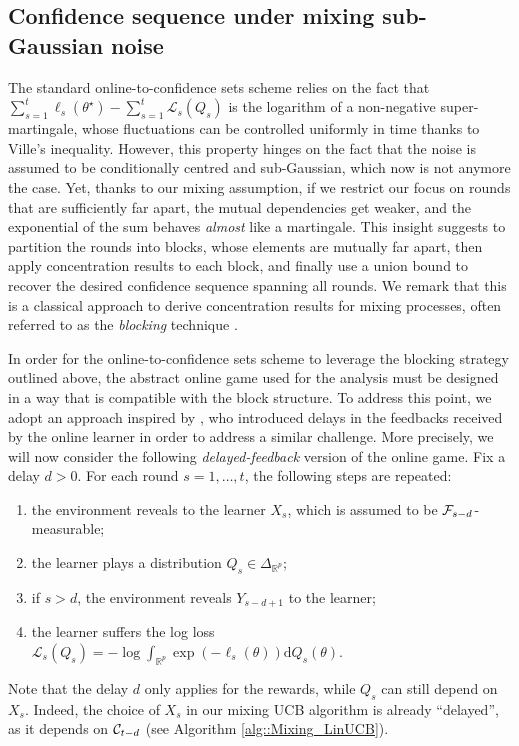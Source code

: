 \subsection{Confidence sequence under mixing sub-Gaussian noise}
The standard online-to-confidence sets scheme relies on the fact that $\sum_{s=1}^t\ell_s(\theta^{\star}) - \sum_{s=1}^{t}\mathcal{L}_s(Q_s)$ is the logarithm of a non-negative super-martingale, whose fluctuations can be controlled uniformly in time thanks to Ville's inequality. However, this property hinges on the fact that the noise is assumed to be conditionally centred and sub-Gaussian, which now is not anymore the case. Yet, thanks to our mixing assumption, if we restrict our focus on rounds that are sufficiently far apart, the mutual dependencies get weaker, and the exponential of the sum behaves \emph{almost} like a martingale. This insight suggests to partition the rounds into blocks, whose elements are mutually far apart, then apply concentration results to each block, and finally use a union bound to recover the desired confidence sequence spanning all rounds. We remark that this is a classical approach to derive concentration results for mixing processes, often referred to as the \emph{blocking} technique \citep{yu1994rates}. 

In order for the online-to-confidence sets scheme to leverage the blocking strategy outlined above, the abstract online game used for the analysis must be designed in a way that is compatible with the block structure. To address this point, we adopt an approach inspired by \cite{abeles2024generalization}, who introduced delays in the feedbacks received by the online learner in order to address a similar challenge. More precisely, we will now consider the following \emph{delayed-feedback} version of the online game. Fix a delay $d>0$. For each round $s = 1, \dots, t$, the following steps are repeated:
\begin{enumerate}
\item the environment reveals to the learner $X_s$, which is assumed to be $\mathcal{F}_{s-d}$-measurable;
\item the learner plays a distribution $Q_s \in \Delta_{\mathbb{R}^p}$;
\item if $s>d$, the environment reveals $Y_{s-d+1}$ to the learner;
\item the learner suffers the log loss $\mathcal{L}_s(Q_s) = -\log\int_{\mathbb{R}^p}\exp(-\ell_s(\theta))\mathrm{d}Q_s(\theta)$.
\end{enumerate}
Note that the delay $d$ only applies for the rewards, while $Q_s$ can still depend on $X_s$. Indeed, the choice of $X_s$ in our mixing UCB algorithm is already ``delayed'', as it depends on $\mathcal{C}_{t-d}$ (see Algorithm \ref{alg::Mixing_LinUCB}).

